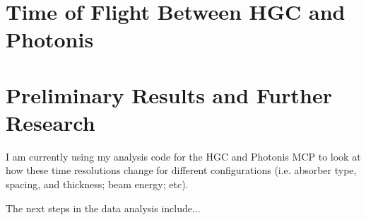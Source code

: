 \documentclass[12pt]{article}
\begin{document}
\section{Time of Flight Between HGC and Photonis}

\section{Preliminary Results and Further Research}
I am currently using my analysis code for the HGC and Photonis MCP to look at how these time resolutions change for different configurations (i.e. absorber type, spacing, and thickness; beam energy; etc). 

The next steps in the data analysis include...



\end{document}

